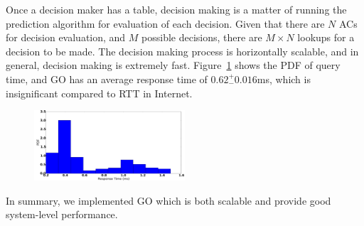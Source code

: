  Once a decision maker has a table, decision making is a matter of running the prediction algorithm for evaluation of each decision. Given that there are $N$ ACs for decision evaluation, and $M$ possible decisions, there are $M \times N$ lookups for a decision to be made. The decision making process is horizontally scalable, and in general, decision making is extremely fast. Figure~\ref{fig:query-scale} shows the PDF of query time, and GO has an average response time of $0.62 ^{+}_{-} 0.016$ms, which is insignificant compared to RTT in Internet.

\begin{figure}[h!]
\centering
 \includegraphics[width=0.5\textwidth] {figures/scale/query_scale.pdf}
\label{fig:query-scale}
\end{figure}

In summary, we implemented GO which is both scalable and provide good system-level performance.

